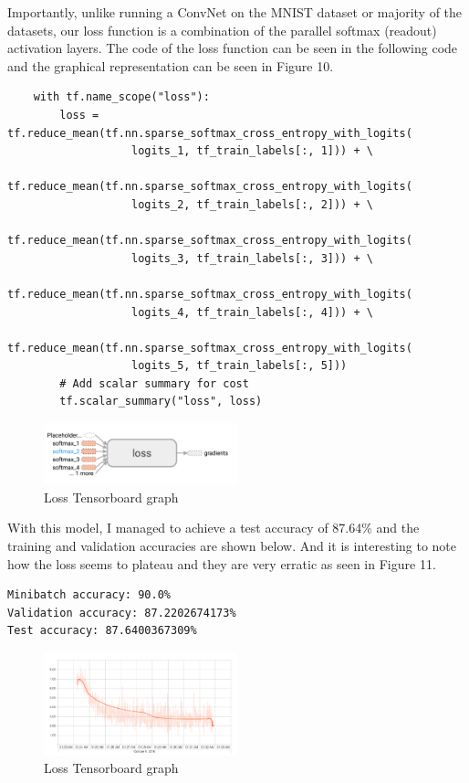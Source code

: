 \documentclass[twoside, column]{article}
\begin{document}
Importantly, unlike running a ConvNet on the MNIST dataset or majority of the datasets, our loss function is a combination of the parallel softmax (readout) activation layers. The code of the loss function can be seen in the following code and the graphical representation can be seen in Figure 10.
\begin{verbatim}
    with tf.name_scope("loss"):
        loss = tf.reduce_mean(tf.nn.sparse_softmax_cross_entropy_with_logits(
                   logits_1, tf_train_labels[:, 1])) + \
               tf.reduce_mean(tf.nn.sparse_softmax_cross_entropy_with_logits(
                   logits_2, tf_train_labels[:, 2])) + \
               tf.reduce_mean(tf.nn.sparse_softmax_cross_entropy_with_logits(
                   logits_3, tf_train_labels[:, 3])) + \
               tf.reduce_mean(tf.nn.sparse_softmax_cross_entropy_with_logits(
                   logits_4, tf_train_labels[:, 4])) + \
               tf.reduce_mean(tf.nn.sparse_softmax_cross_entropy_with_logits(
                   logits_5, tf_train_labels[:, 5]))
        # Add scalar summary for cost
        tf.scalar_summary("loss", loss)
 \end{verbatim}
 
\begin{figure}
\caption{Loss Tensorboard graph}
\centering
\includegraphics[width=0.5\textwidth]{loss_trial_2}
\end{figure}

With this model, I managed to achieve a test accuracy of 87.64\% and the training and validation accuracies are shown below. And it is interesting to note how the loss seems to plateau and they are very erratic as seen in Figure 11. 
\definecolor{bg}{rgb}{0.95,0.95,0.95}
\begin{verbatim}
Minibatch accuracy: 90.0%
Validation accuracy: 87.2202674173%
Test accuracy: 87.6400367309%
 \end{verbatim}

\begin{figure}
\caption{Loss Tensorboard graph}
\centering
\includegraphics[width=0.5\textwidth]{loss_trial_1}
\end{figure}
\end{document}
